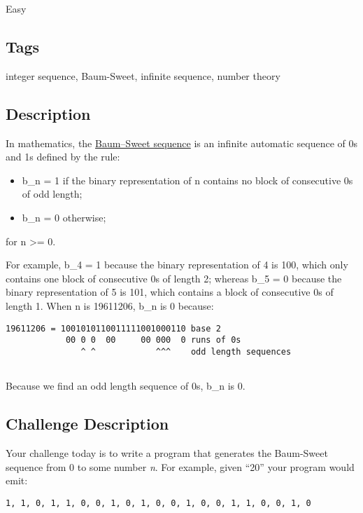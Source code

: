 Easy

\subsection{Tags}\label{tags-16}

integer sequence, Baum-Sweet, infinite sequence, number theory

\subsection{Description}\label{description-16}

In mathematics, the
\href{https://en.wikipedia.org/wiki/Baum\%E2\%80\%93Sweet_sequence}{Baum--Sweet
sequence} is an infinite automatic sequence of 0s and 1s defined by the
rule:

\begin{itemize}
\itemsep1pt\parskip0pt
\item
  b\_n = 1 if the binary representation of n contains no block of
  consecutive 0s of odd length;
\item
  b\_n = 0 otherwise;
\end{itemize}

for n \textgreater{}= 0.

For example, b\_4 = 1 because the binary representation of 4 is 100,
which only contains one block of consecutive 0s of length 2; whereas
b\_5 = 0 because the binary representation of 5 is 101, which contains a
block of consecutive 0s of length 1. When n is 19611206, b\_n is 0
because:

\begin{verbatim}
19611206 = 1001010110011111001000110 base 2
            00 0 0  00     00 000  0 runs of 0s
               ^ ^            ^^^    odd length sequences
           
\end{verbatim}

Because we find an odd length sequence of 0s, b\_n is 0.

\subsection{Challenge Description}\label{challenge-description}

Your challenge today is to write a program that generates the Baum-Sweet
sequence from 0 to some number \emph{n}. For example, given ``20'' your
program would emit:

\begin{verbatim}
1, 1, 0, 1, 1, 0, 0, 1, 0, 1, 0, 0, 1, 0, 0, 1, 1, 0, 0, 1, 0
\end{verbatim}

